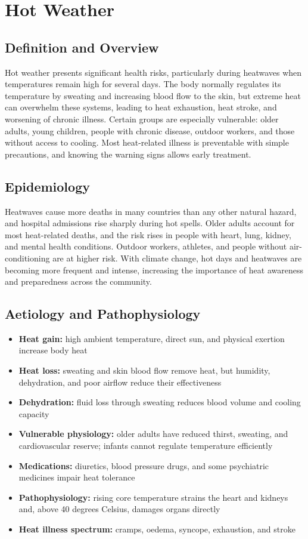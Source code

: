 \chapter{Hot Weather}

\section*{Definition and Overview}
Hot weather presents significant health risks, particularly during heatwaves when temperatures remain high for several days. The body normally regulates its temperature by sweating and increasing blood flow to the skin, but extreme heat can overwhelm these systems, leading to heat exhaustion, heat stroke, and worsening of chronic illness. Certain groups are especially vulnerable: older adults, young children, people with chronic disease, outdoor workers, and those without access to cooling. Most heat-related illness is preventable with simple precautions, and knowing the warning signs allows early treatment.

\section*{Epidemiology}
Heatwaves cause more deaths in many countries than any other natural hazard, and hospital admissions rise sharply during hot spells. Older adults account for most heat-related deaths, and the risk rises in people with heart, lung, kidney, and mental health conditions. Outdoor workers, athletes, and people without air-conditioning are at higher risk. With climate change, hot days and heatwaves are becoming more frequent and intense, increasing the importance of heat awareness and preparedness across the community.

\section*{Aetiology and Pathophysiology}
\begin{itemize}
    \item \textbf{Heat gain:} high ambient temperature, direct sun, and physical exertion increase body heat
    \item \textbf{Heat loss:} sweating and skin blood flow remove heat, but humidity, dehydration, and poor airflow reduce their effectiveness
    \item \textbf{Dehydration:} fluid loss through sweating reduces blood volume and cooling capacity
    \item \textbf{Vulnerable physiology:} older adults have reduced thirst, sweating, and cardiovascular reserve; infants cannot regulate temperature efficiently
    \item \textbf{Medications:} diuretics, blood pressure drugs, and some psychiatric medicines impair heat tolerance
    \item \textbf{Pathophysiology:} rising core temperature strains the heart and kidneys and, above 40 degrees Celsius, damages organs directly
    \item \textbf{Heat illness spectrum:} cramps, oedema, syncope, exhaustion, and stroke
\end{itemize}

